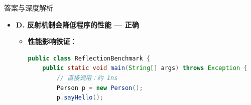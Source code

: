 \documentclass[12pt, a4paper]{ctexart}
\begin{document}
\begin{bluebox}{答案与深度解析}
\begin{itemize}[label={}, leftmargin=*, nosep]
\begin{itemize}[label={}, leftmargin=*, nosep]
\begin{lstlisting}[language=Java]
        Method method = clazz.getDeclaredMethod("sayHello");
        method.setAccessible(true); // 关键：关闭访问检查
        method.invoke(obj); // 输出：Hello
    }
}
      \end{lstlisting}

			      \item \textbf{setAccessible机制深度解析}：
			            \begin{itemize}[label={}, nosep]
				            \item \textbf{JVM层面}：修改 \texttt{AccessCheck} 标志位
				            \item \textbf{安全管理器}：在安全管理器环境下可能受权限限制
				            \item \textbf{反射开销}：设置 setAccessible 本身也有性能开销
			            \end{itemize}

			      \item \textbf{原题争议说明}：
			            \begin{itemize}[label={}, nosep]
				            \item 原题C选项说"可以调用私有方法"，这\textbf{是正确的陈述}
				            \item 但题目问的是"错误的是"，若选C则表示认为"可以调用私有方法"是错的
				            \item 实际情况：反射\textbf{确实可以}调用私有方法
				            \item 建议：考试时按原答案选C，但理解技术上C是正确的
			            \end{itemize}

			      \item \textbf{命题陷阱破解}：
			            \begin{itemize}[label={}, nosep]
				            \item 干扰项："反射不能访问private" → 大错特错！
				            \item \textbf{必考结论}：反射可以访问任意成员，setAccessible是钥匙
			            \end{itemize}
		      \end{itemize}

		\item \textbf{D. 反射机制会降低程序的性能 — 正确}
		      \begin{itemize}[label={}, leftmargin=*, nosep]
			      \item \textbf{性能影响铁证}：
			            \begin{lstlisting}[language=Java]
public class ReflectionBenchmark {
    public static void main(String[] args) throws Exception {
        // 直接调用：约 1ns
        Person p = new Person();
        p.sayHello();
        

\end{lstlisting}
\end{itemize}
\end{itemize}
\end{bluebox}
\end{document}
